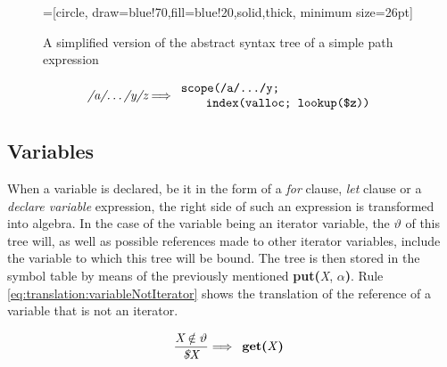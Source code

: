 \begin{figure}[h]
\centering
{}=[circle, draw=blue!70,fill=blue!20,solid,thick, minimum
size=26pt]
\label{fig:translation:pathAST}
\caption[AST of path expression]{A simplified version of the abstract syntax
tree of a simple path expression}
\end{figure}


\begin{equation}
\centering
\textit{/a/\ldots/y/z}
\Longrightarrow
\begin{array}{l}
	\mbox{\texttt{scope(/a/\ldots/y;}} \\
	\qquad \mbox{\texttt{index(valloc; lookup(\$z))}}
\end{array}
\label{eq:translation:pathExpr}
\end{equation}


\subsection{Variables}
\label{sect:translation:variables}
When a variable is declared, be it in the form of a \textit{for} clause,
\textit{let} clause or a \textit{declare variable} expression, the right side
of such an expression is transformed into algebra. In the case of the
variable being an iterator variable, the $\vartheta$ of this tree will, as well
as possible references made to other iterator variables, include the variable
to which this tree will be bound. The tree is then stored in the symbol
table by means of the previously mentioned \textbf{put(}\textit{X},
$\alpha$\textbf{)}. Rule \ref{eq:translation:variableNotIterator} shows the
translation of the reference of a variable that is not an iterator.

\begin{equation}
\centering
\frac{\displaystyle \textit{X} \notin \vartheta}{\displaystyle \textit{\$X}}
\Longrightarrow
\begin{array}{l}
	\mbox{\textbf{get(}\textit{X}\textbf{)}}
\end{array}
\label{eq:translation:variableNotIterator}
\end{equation}

